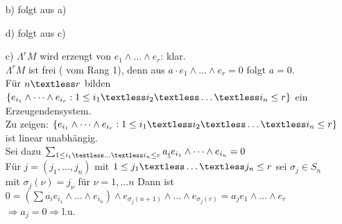  \begin{Bew}
  \begin{enumerate}
   \item[ b) ] folgt aus a)
   \item[ d) ] folgt aus c)
   \item[ c) ] $\Lambda^rM$ wird erzeugt von $e_1 \wedge \dots \wedge e_r$: klar.\\
 $\Lambda^rM$ ist frei ( vom Rang 1), denn aus $a \cdot e_1 \wedge \dots \wedge e_r = 0$ folgt $a=0$. \\
    Für $n \textless r$ bilden  $\{e_{i_1} \wedge \dots \wedge e_{i_r}: 1 \leq i_1 \textless i_2 \textless \dots \textless i_n \leq r \}$
    ein Erzeugendensystem. \\
    Zu zeigen: $\{e_{i_1} \wedge \dots \wedge e_{i_r}: 1 \leq i_1 \textless i_2 \textless \dots \textless i_n \leq r \}$ ist linear unabh\"angig.\\
 Sei dazu $\sum_{1 \leq i_1 \textless \dots \textless i_n \leq r} a_{\underline{i}}e_{i_1} \wedge \dots \wedge e_{i_n} = 0$\\
    F\"ur $j = (j_1, \dots, j_n)$ mit $1 \leq j_1 \textless \dots \textless j_n \leq r$ sei $\sigma_j \in S_n$ mit 
    $\sigma_j(\nu) = j_{\nu}$ für $\nu = 1, \dots n$ Dann ist $ 0= (\sum a_i e_{i_1} \wedge \dots \wedge e_{i_n}) \wedge 
    e_{\sigma_j(n+1)}  \wedge \dots \wedge e_{\sigma_j(r) } = a_j e_1 \wedge \dots \wedge e_r$ $\Rightarrow a_j = 0 \Rightarrow $l.u. 
  \end{enumerate}
 \end{Bew}
